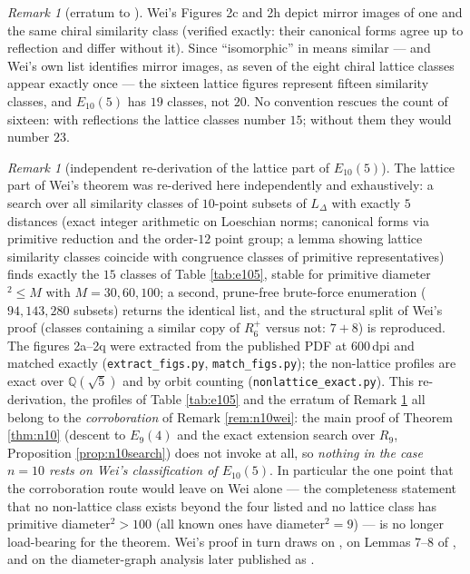\documentclass[11pt]{article}
\theoremstyle{definition}
\theoremstyle{remark}
\newtheorem{remark}[theorem]{Remark}
\newcommand{\Q}{\mathbb{Q}}
\newcommand{\Lat}{L_{\Delta}}
\begin{document}
\begin{remark}[erratum to {\cite[Theorem~11]{Wei12}}]\label{rem:weierratum}
Wei's Figures 2c and 2h depict mirror images of one and the same chiral similarity
class (verified exactly: their canonical forms agree up to reflection and differ
without it). Since ``isomorphic'' in \cite{Wei12} means similar --- and Wei's own list
identifies mirror images, as seven of the eight chiral lattice classes appear exactly
once --- the sixteen lattice figures represent fifteen similarity classes, and
$E_{10}(5)$ has $19$ classes, not $20$. No convention rescues the count of sixteen:
with reflections the lattice classes number $15$; without them they would number $23$.
\end{remark}

\begin{remark}[independent re-derivation of the lattice part of $E_{10}(5)$]\label{rem:weiverif}
The lattice part of Wei's theorem was re-derived here independently and exhaustively:
a search over all similarity classes of $10$-point subsets of $\Lat$ with exactly $5$
distances (exact integer arithmetic on Loeschian norms; canonical forms via primitive
reduction and the order-$12$ point group; a lemma showing lattice similarity classes
coincide with congruence classes of primitive representatives) finds exactly the $15$
classes of Table \ref{tab:e105}, stable for primitive diameter$^2 \le M$ with
$M = 30, 60, 100$; a second, prune-free brute-force enumeration ($94{,}143{,}280$
subsets) returns the identical list, and the structural split of Wei's proof (classes
containing a similar copy of $R_6^+$ versus not: $7 + 8$) is reproduced. The figures
2a--2q were extracted from the published PDF at 600\,dpi and matched exactly
(\texttt{extract\_figs.py}, \texttt{match\_figs.py}); the non-lattice profiles are
exact over $\Q(\sqrt5)$ and by orbit counting (\texttt{nonlattice\_exact.py}).
This re-derivation, the profiles of Table \ref{tab:e105} and the erratum of Remark
\ref{rem:weierratum} all belong to the \emph{corroboration} of Remark \ref{rem:n10wei}:
the main proof of Theorem \ref{thm:n10} (descent to $E_9(4)$ and the exact extension
search over $R_9$, Proposition \ref{prop:n10search}) does not invoke \cite{Wei12} at all,
so \emph{nothing in the case $n = 10$ rests on Wei's classification of $E_{10}(5)$}. In
particular the one point that the corroboration route would leave on Wei alone --- the
completeness statement that no non-lattice class exists beyond the four listed and no
lattice class has primitive diameter$^2 > 100$ (all known ones have diameter$^2 = 9$) ---
is no longer load-bearing for the theorem. Wei's proof in turn draws on
\cite{Shinohara04,Shinohara08,ErFi96,LanWei13}, on Lemmas 7--8 of \cite{Wei11}, and on the
diameter-graph analysis later published as \cite{WeiLiCongGao14}.
\end{remark}
\end{document}
